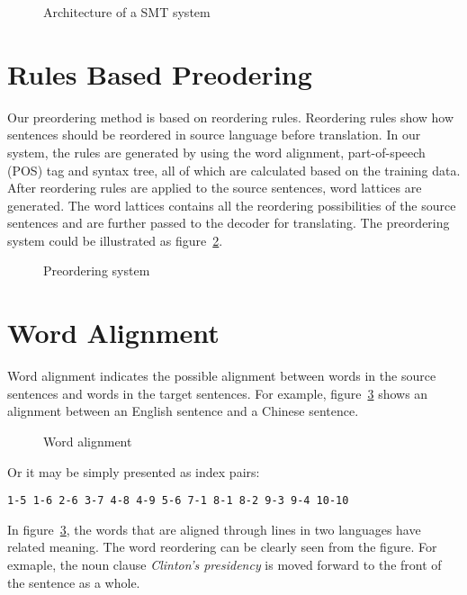 \begin{figure}
\centering

\caption{Architecture of a SMT system}
\label{smt}
\end{figure}

\section{Rules Based Preodering}
\label{ch:Foundations:sec:PreReorderingSystem}

Our preordering method is based on reordering rules. Reordering rules show how sentences should be reordered in source language before translation. In our system, the rules are generated by using the word alignment, part-of-speech (POS) tag and syntax tree, all of which are calculated based on the training data. After reordering rules are applied to the source sentences, word lattices are generated. The word lattices contains all the reordering possibilities of the source sentences and are further passed to the decoder for translating. The preordering system could be illustrated as figure~\ref{prereordering}.

\begin{figure}
\centering

\caption{Preordering system}
\label{prereordering}
\end{figure}


\section{Word Alignment}
\label{ch:Foundations:sec:Alignment}

Word alignment indicates the possible alignment between words in the source sentences and words in the target sentences. For example, figure~\ref{alignment} shows an alignment between an English sentence and a Chinese sentence.

\begin{figure}[H]
\centering

\caption{Word alignment}
\label{alignment}
\end{figure}
Or it may be simply presented as index pairs:
\begin{center}
\texttt{1-5 1-6 2-6 3-7 4-8 4-9 5-6 7-1 8-1 8-2 9-3 9-4 10-10}
\end{center}

In figure~\ref{alignment}, the words that are aligned through lines in two languages have related meaning. The word reordering can be clearly seen from the figure. For exmaple, the noun clause \emph{Clinton's presidency} is moved forward to the front of the sentence as a whole.

